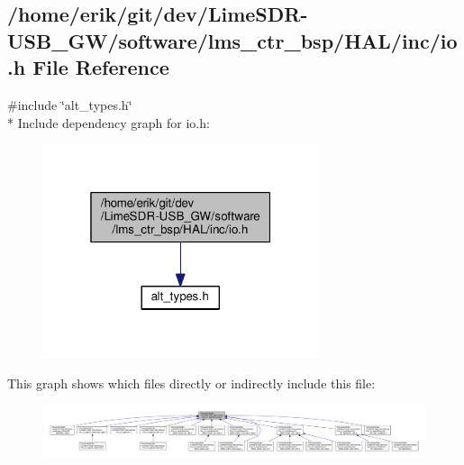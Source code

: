 \subsection{/home/erik/git/dev/\+Lime\+S\+D\+R-\/\+U\+S\+B\+\_\+\+G\+W/software/lms\+\_\+ctr\+\_\+bsp/\+H\+A\+L/inc/io.h File Reference}
\label{io_8h}
{\ttfamily \#include \char`\"{}alt\+\_\+types.\+h\char`\"{}}\\*
Include dependency graph for io.\+h\+:
\nopagebreak
\begin{figure}[H]
\begin{center}
\leavevmode
\includegraphics[width=229pt]{d8/da5/io_8h__incl}
\end{center}
\end{figure}
This graph shows which files directly or indirectly include this file\+:
\nopagebreak
\begin{figure}[H]
\begin{center}
\leavevmode
\includegraphics[width=350pt]{da/de4/io_8h__dep__incl}
\end{center}
\end{figure}
